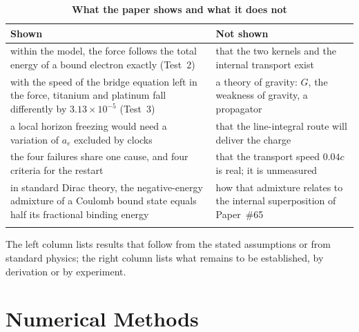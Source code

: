 \documentclass[%
 reprint, amsmath,amssymb, aps, prb, ]{revtex4-2}
\numberwithin{equation}{section}
\begin{document}
\begin{table}[t!]
\centering
\caption{\textbf{What the paper shows and what it does not}}
\label{tab:app_read}
\renewcommand{\arraystretch}{1.4}
\setlength{\tabcolsep}{8pt}
\begin{tabular}{>{\raggedright\arraybackslash}p{7.4cm}>{\raggedright\arraybackslash}p{7.4cm}}
\toprule
\textbf{Shown} & \textbf{Not shown} \\
\midrule
within the model, the force follows the total energy of a bound electron exactly (Test~2) & that the two kernels and the internal transport exist \\
\addlinespace[0.3cm]
with the speed of the bridge equation left in the force, titanium and platinum fall differently by $3.13\times10^{-5}$ (Test~3) & a theory of gravity: $G$, the weakness of gravity, a propagator \\
\addlinespace[0.3cm]
a local horizon freezing would need a variation of $a_e$ excluded by clocks & that the line-integral route will deliver the charge \\
\addlinespace[0.3cm]
the four failures share one cause, and four criteria for the restart & that the transport speed $0.04c$ is real; it is unmeasured \\
\addlinespace[0.3cm]
in standard Dirac theory, the negative-energy admixture of a Coulomb bound state equals half its fractional binding energy & how that admixture relates to the internal superposition of Paper~\#65 \\
\addlinespace[0.2cm]
\bottomrule
\end{tabular}
\vspace{0.2cm}
\begin{minipage}{0.95\textwidth}
\justifying\footnotesize
The left column lists results that follow from the stated assumptions or from standard physics; the right column lists what remains to be established, by derivation or by experiment.
\end{minipage}
\end{table}



\section{Numerical Methods}
\label{app:methods}
\end{document}
